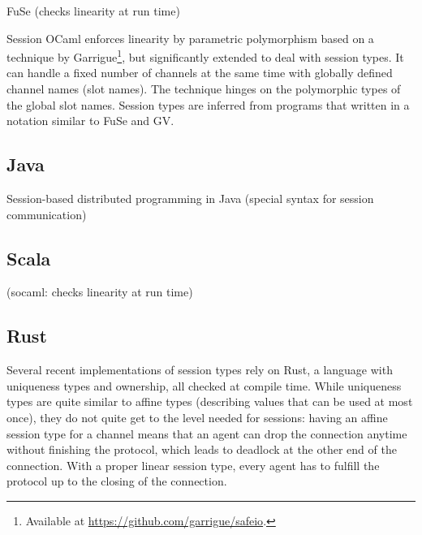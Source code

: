\documentclass[acmsmall,screen,anonymous,review]{acmart}
\begin{document}
FuSe \cite{DBLP:journals/jfp/Padovani17} (checks linearity at run time)

Session OCaml \cite{DBLP:journals/scp/ImaiYY19} enforces linearity by
parametric polymorphism based on a technique by
Garrigue\footnote{Available at
  \url{https://github.com/garrigue/safeio}.}, but significantly
extended to deal with session types.
It can handle a fixed number of channels at the same time with
globally defined channel names (slot names). The technique hinges on
the polymorphic types of the global slot names.
Session types are inferred from programs that written in a notation
similar to FuSe and GV.


\subsection{Java}
\label{sec:java}

Session-based distributed programming in Java
\cite{DBLP:conf/ecoop/HuYH08} (special syntax for session
communication)

\subsection{Scala}
\label{sec:scala}

\cite{DBLP:conf/ecoop/ScalasY16} (socaml: checks linearity at run time)

\subsection{Rust}
\label{sec:rust}



Several recent implementations of session types rely on Rust, a
language with uniqueness types and ownership, all checked at compile
time. While uniqueness types are quite similar to affine types
(describing values that can be used at most once), they do not quite
get to the level needed for sessions: having an affine session type
for a channel means that an agent can drop the connection anytime
without finishing the protocol, which leads to deadlock at the other
end of the connection. With a proper linear session type, every agent has to
fulfill the protocol up to the closing of the connection.

\cite{DBLP:conf/ecoop/ChenBT22}
\cite{DBLP:conf/ecoop/LagaillardieNY22}
\cite{DBLP:conf/ppopp/CutnerYV22}
\cite{DBLP:conf/coordination/CutnerY21}
\cite{DBLP:conf/coordination/LagaillardieNY20}
\cite{DBLP:journals/corr/abs-1909-05970}
\cite{DBLP:conf/icfp/JespersenML15}
\end{document}
